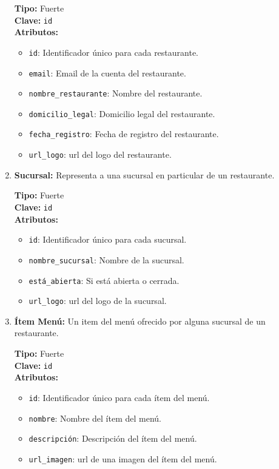 \begin{enumerate}
    \textbf{Tipo:} Fuerte \\
    \textbf{Clave:} \texttt{id} \\
    \textbf{Atributos:}
    \begin{itemize}
        \item \texttt{id}: Identificador único para cada restaurante.
        \item \texttt{email}: Email de la cuenta del restaurante.
        \item \texttt{nombre\_restaurante}: Nombre del restaurante.
        \item \texttt{domicilio\_legal}: Domicilio legal del restaurante.
        \item \texttt{fecha\_registro}: Fecha de registro del restaurante.
        \item \texttt{url\_logo}: url del logo del restaurante.
    \end{itemize}
    
    \item \textbf{Sucursal:} Representa a una sucursal en particular de un restaurante.
    
    \textbf{Tipo:} Fuerte \\
    \textbf{Clave:} \texttt{id} \\
    \textbf{Atributos:}
    \begin{itemize}
        \item \texttt{id}: Identificador único para cada sucursal.
        \item \texttt{nombre\_sucursal}: Nombre de la sucursal.
        \item \texttt{está\_abierta}: Si está abierta o cerrada.
        \item \texttt{url\_logo}: url del logo de la sucursal.
    \end{itemize}
    
    \item \textbf{Ítem Menú:} Un item del menú ofrecido por alguna sucursal de un restaurante.
    
    \textbf{Tipo:} Fuerte \\
    \textbf{Clave:} \texttt{id} \\
    \textbf{Atributos:}
    \begin{itemize}
        \item \texttt{id}: Identificador único para cada ítem del menú.
        \item \texttt{nombre}: Nombre del ítem del menú.
        \item \texttt{descripción}: Descripción del ítem del menú.
        \item \texttt{url\_imagen}: url de una imagen del ítem del menú.
    \end{itemize}


\end{enumerate}
